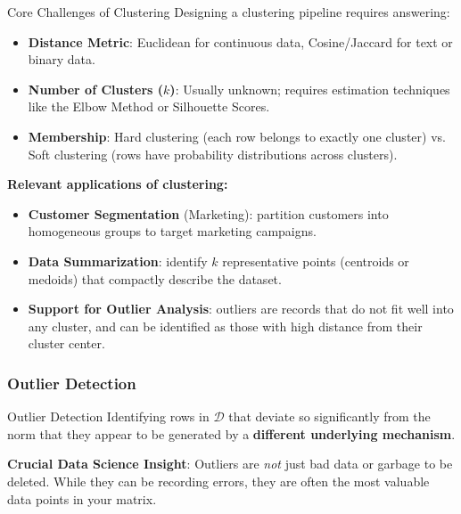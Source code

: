 \documentclass[11pt]{article}
\theoremstyle{smallexample}
\newcommand{\vs}{\vspace{0.2\baselineskip}}
\begin{document}
\begin{defbox}{Core Challenges of Clustering}
    Designing a clustering pipeline requires answering:
    \begin{itemize}
        \item \textbf{Distance Metric}: Euclidean for continuous data, Cosine/Jaccard for text or binary data.
        \item \textbf{Number of Clusters ($k$)}: Usually unknown; requires estimation techniques like the Elbow Method or Silhouette Scores.
        \item \textbf{Membership}: Hard clustering (each row belongs to exactly one cluster) vs. Soft clustering (rows have probability distributions across clusters).
    \end{itemize}
\end{defbox}

\vs
\textbf{Relevant applications of clustering:}
\begin{itemize}
    \item \textbf{Customer Segmentation} (Marketing): partition customers into
    homogeneous groups to target marketing campaigns.
    \item \textbf{Data Summarization}: identify $k$ representative points
    (centroids or medoids) that compactly describe the dataset.
    \item \textbf{Support for Outlier Analysis}: outliers are records that do
    not fit well into any cluster, and can be identified as those with high
    distance from their cluster center.
\end{itemize}

\subsubsection{Outlier Detection}

\begin{defbox}{Outlier Detection}
    Identifying rows in $\mathcal{D}$ that deviate so significantly from the norm that they appear to be generated by a \textbf{different underlying mechanism}.
\end{defbox}

\textbf{Crucial Data Science Insight}: Outliers are \textit{not} just bad data or garbage to be deleted. While they can be recording errors, they are often the most valuable data points in your matrix. 
\end{document}
